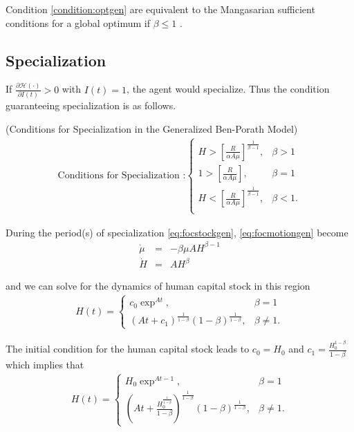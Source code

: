 \indent Condition \ref{condition:optgen} are equivalent to the Mangasarian sufficient conditions for a global optimum if $\beta \leq 1$ \citep[see][]{mangasarian1966sufficient}.

\subsection{Specialization}
If $\frac{\partial \mathcal{H} (\cdot)}{\partial I(t)} >0$ with $I(t)=1$, the agent would specialize. Thus the condition guaranteeing specialization is as follows.

\begin{condition} (Conditions for Specialization in the Generalized Ben-Porath Model) \label{condition:spe}
\begin{eqnarray}
\text{Conditions for Specialization :}
\begin{cases}
H > \left[ \frac{R}{\alpha A \mu} \right]^{\frac{1}{\beta - 1}}, & \beta > 1 \\
1 > \left[ \frac{R}{\alpha A \mu} \right], & \beta = 1 \\
H < \left[ \frac{R}{\alpha A \mu} \right]^{\frac{1}{\beta - 1}}, & \beta < 1. \\
\end{cases}
\end{eqnarray}
\end{condition}

\indent During the period(s) of specialization \eqref{eq:focstockgen}, \eqref{eq:focmotiongen} become 
\begin{eqnarray}
\dot{\mu} &=& - \beta \mu A H^{\beta - 1} \label{eq:focstockgenspe} \\
\dot{H}  &=& A H^{\beta} \label{eq:focmotiongenspe}
\end{eqnarray}

\noindent and we can solve for the dynamics of human capital stock in this region
\begin{eqnarray}
H(t) =
\begin{cases}
c_{0} \exp^{At}, & \beta = 1 \\ 
\left( At + c_{1} \right)^{\frac{1}{1 - \beta}} (1 - \beta)^{\frac{1}{1 - \beta}}, & \beta \neq 1.

\end{cases}
\end{eqnarray}

\noindent The initial condition for the human capital stock leads to $c_{0} = H_{0} $ and $c_{1} = \frac{H_{0}^{1 - \beta}}{1-\beta}$ which implies that
\begin{eqnarray}
H(t) =
\begin{cases}
H_{0} \exp^{At - 1}, & \beta = 1 \\
\left( At + \frac{H_{0}^{\frac{1}{1-\beta}}}{1-\beta} \right)^{\frac{1}{1 - \beta}} \left( 1 - \beta \right)^{\frac{1}{1-\beta}}, & \beta \neq 1. \label{eq:humanspe}
\end{cases}
\end{eqnarray}

